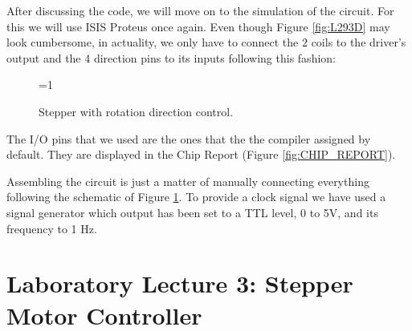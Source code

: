 \documentclass[a4paper, 11pt, oneside]{article}
\begin{document}
After discussing the code, we will move on to the simulation of the circuit. For this we will use ISIS Proteus once again. Even though Figure \ref{fig:L293D} may look cumbersome, in actuality, we only have to connect the 2 coils to the driver's output and the 4 direction pins to its inputs following this fashion:\medskip

\begin{figure}[H]
    \centering
    
    \ifnum\value{ANIMATION}=1 {
    } 
    \fi
    
    \caption{Stepper with rotation direction control.}
    \label{fig:STEPPER_ROTATION}
\end{figure}

The I/O pins that we used are the ones that the the compiler assigned by default. They are displayed in the Chip Report (Figure \ref{fig:CHIP_REPORT}).\medskip

Assembling the circuit is just a matter of manually connecting everything following the schematic of Figure \ref{fig:STEPPER_ROTATION}. To provide a clock signal we have used a signal generator which output has been set to a TTL level, 0 to 5V, and its frequency to 1 Hz.  

\clearpage

\section{Laboratory Lecture 3: Stepper Motor Controller}

\clearpage
\printbibliography
\end{document}
